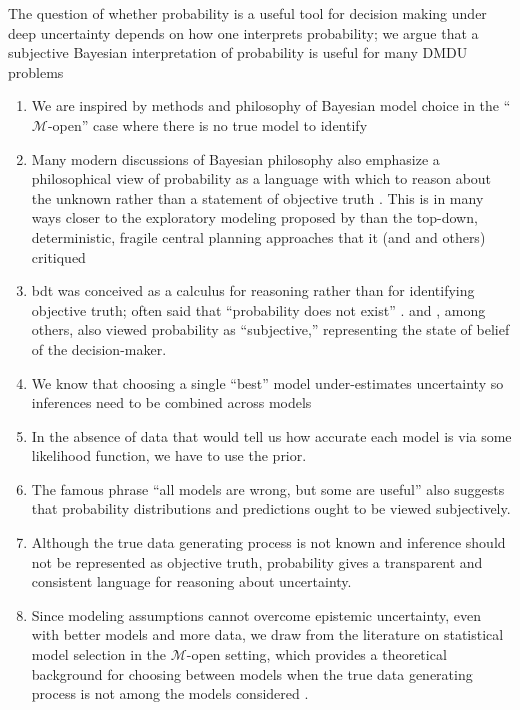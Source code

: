 \documentclass[12pt]{article}
\makeatletter
\DeclareRobustCommand\onedot{\futurelet\@let@token\@onedot}
\def\@onedot{\ifx\@let@token.\else.\null\fi\xspace}
\def\eg{\emph{e.g}\onedot} \def\Eg{\emph{E.g}\onedot}
\DeclareRobustCommand\onedot{\futurelet\@let@token\@onedot}
\def\@onedot{\ifx\@let@token.\else.\null\fi\xspace}
\def\eg{\emph{e.g}\onedot} \def\Eg{\emph{E.g}\onedot}
\makeatother
\begin{document}
The question of whether probability is a useful tool for decision making under deep uncertainty depends on how one interprets probability; we argue that a subjective Bayesian interpretation of probability is useful for many DMDU problems
\begin{enumerate}
    \item We are inspired by methods and philosophy of Bayesian model choice in the ``$\mathcal{M}$-open'' case where there is no true model to identify
    \item Many modern discussions of Bayesian philosophy \citep{jaynes_probability:2003,McElreath:2016vu,Gelman:2014tc,bernardo_bayesian:1994} also emphasize a philosophical view of probability as a language with which to reason about the unknown rather than a statement of objective truth \citep[see][for a thorough discussion of Bayesian philosophy]{gelman_philosophy:2013}. This is in many ways closer to the exploratory modeling proposed by \citet{bankes:1993} than the top-down, deterministic, fragile central planning approaches that it (and \cite{rittel:1973} and others) critiqued
    \item \gls{bdt} was conceived as a calculus for reasoning rather than for identifying objective truth; \citeauthor{definetti_probability:1972} often said that ``probability does not exist'' \citeyear{definetti_probability:1972}. \citet{savage:1954} and \citet{ramsey_probability:2016}, among others, also viewed probability as ``subjective,'' representing the state of belief of the decision-maker.
    \item We know that choosing a single ``best'' model under-estimates uncertainty so inferences need to be combined across models \citep[\eg, as in stacking;][]{Yao:2018bu}
    \item In the absence of data that would tell us how accurate each model is via some likelihood function, we have to use the prior.
    \item The famous phrase ``all models are wrong, but some are useful'' \citep[generally attributed to][]{box:1976} also suggests that probability distributions and predictions ought to be viewed subjectively.
    \item Although the true data generating process is not known and inference should not be represented as objective truth, probability gives a transparent and consistent language for reasoning about uncertainty.
    \item Since modeling assumptions cannot overcome epistemic uncertainty, even with better models and more data, we draw from the literature on statistical model selection in the $\mathcal{M}$-open setting, which provides a theoretical background for choosing between models when the true data generating process is not among the models considered \citep[see][]{Piironen:2017eh}.

\end{enumerate}
\end{document}
